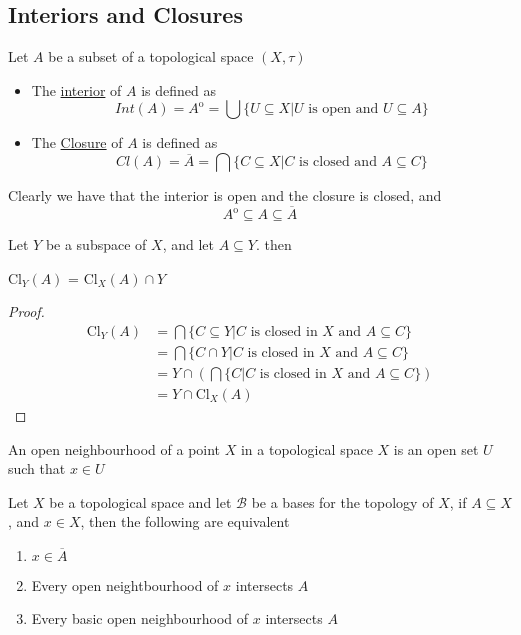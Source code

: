 \subsection{Interiors and Closures}
\begin{definition}
    Let $A$ be a subset of a topological space $(X,\tau)$
    \begin{itemize}
        \item The \href{https://en.wikipedia.org/wiki/Interior_(topology)}{interior} of $A$ is defined as \[ Int(A) = A^\mathrm{o} = \bigcup\{U\subseteq X\vert U\text{ is open and $U\subseteq A$}\}\]
        \item The \href{https://en.wikipedia.org/wiki/Closure_(topology)}{Closure} of $A$ is defined as \[Cl(A) = \overline{A} = \bigcap\{C\subseteq X\vert \text{$C$ is closed and $A\subseteq C$}\}\]
    \end{itemize}
\end{definition}
Clearly we have that the interior is open and the closure is closed, and
\[A^\mathrm{o}\subseteq A\subseteq \overline{A}\]
\begin{proposition}
    Let $Y$ be a subspace of $X$, and let $A\subseteq Y$. then 
    \begin{center}
        Cl$_Y(A)$ = Cl$_X(A)\cap Y$
    \end{center}
\end{proposition}
\begin{proof}
    \begin{align*}
        \text{Cl}_Y(A) &= \bigcap\{C\subseteq Y\vert C\text{ is closed in $X$ and $A\subseteq C$}\}\\
        & = \bigcap\{C\cap Y\vert C\text{ is closed in $X$ and $A\subseteq C$}\}\\
        &= Y\cap\left(\bigcap \{C\vert C\text{ is closed in $X$ and $A\subseteq C$}\}\right)\\
        &= Y\cap \text{Cl}_X(A)
    \end{align*}
\end{proof}
\begin{definition}
    An open neighbourhood of a point $X$ in a topological space $X$ is an open set $U$ such that $x\in U$
\end{definition}
\begin{proposition}
    Let $X$ be a topological space and let $\mathscr{B}$ be a bases for the topology of $X$, if $A\subseteq X$, and $x\in X$, then the following are equivalent
    \begin{enumerate}
        \item $x\in\overline{A}$
        \item Every open neightbourhood of $x$ intersects $A$
        \item Every basic open neighbourhood of $x$ intersects $A$
    \end{enumerate}
\end{proposition}
